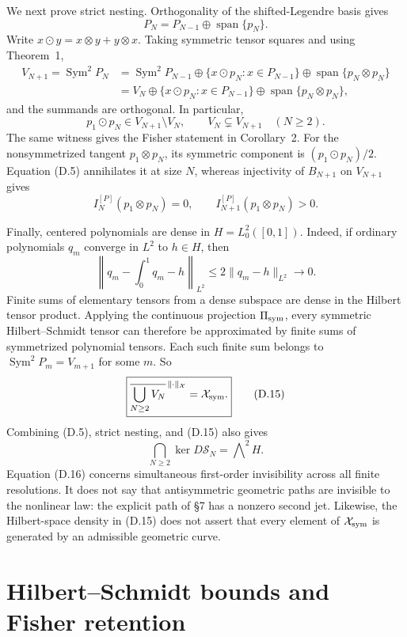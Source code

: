 \documentclass[11pt]{article}
\begin{document}
We next prove strict nesting. Orthogonality of the shifted-Legendre basis gives \[ P_N=P_{N-1}\oplus\operatorname{span}\{p_N\}. \tag{D.10} \] Write \(x\odot y=x\otimes y+y\otimes x\). Taking symmetric tensor squares and using Theorem~1, \[ \begin{aligned} V_{N+1}=\operatorname{Sym}^2P_N &=\operatorname{Sym}^2P_{N-1} \oplus\{x\odot p_N:x\in P_{N-1}\} \oplus\operatorname{span}\{p_N\otimes p_N\}\\ &=V_N\oplus\{x\odot p_N:x\in P_{N-1}\} \oplus\operatorname{span}\{p_N\otimes p_N\}, \end{aligned} \tag{D.11} \] and the summands are orthogonal. In particular, \[ p_1\odot p_N\in V_{N+1}\setminus V_N, \qquad V_N\subsetneq V_{N+1} \quad(N\ge2). \tag{D.12} \] The same witness gives the Fisher statement in Corollary~2. For the nonsymmetrized tangent \(p_1\otimes p_N\), its symmetric component is \((p_1\odot p_N)/2\). Equation (D.5) annihilates it at size \(N\), whereas injectivity of \(B_{N+1}\) on \(V_{N+1}\) gives \[ I_N^{[P]}(p_1\otimes p_N)=0, \qquad I_{N+1}^{[P]}(p_1\otimes p_N)>0. \tag{D.13} \]

Finally, centered polynomials are dense in \(H=L_0^2([0,1])\). Indeed, if ordinary polynomials \(q_m\) converge in \(L^2\) to \(h\in H\), then \[ \left\|q_m-\int_0^1q_m-h\right\|_{L^2} \le2\|q_m-h\|_{L^2}\longrightarrow0. \tag{D.14} \] Finite sums of elementary tensors from a dense subspace are dense in the Hilbert tensor product. Applying the continuous projection \(\Pi_{\rm sym}\), every symmetric Hilbert--Schmidt tensor can therefore be approximated by finite sums of symmetrized polynomial tensors. Each such finite sum belongs to \(\operatorname{Sym}^2P_m=V_{m+1}\) for some \(m\). So \[ \boxed{ \overline{\bigcup_{N\ge2}V_N}^{\,\|\cdot\|_{\mathcal X}} =\mathcal X_{\rm sym}.} \tag{D.15} \] Combining (D.5), strict nesting, and (D.15) also gives \[ \bigcap_{N\ge2}\ker D\mathscr S_N =\bigwedge\nolimits^2H. \tag{D.16} \] Equation (D.16) concerns simultaneous first-order invisibility across all finite resolutions. It does not say that antisymmetric geometric paths are invisible to the nonlinear law: the explicit path of \S7 has a nonzero second jet. Likewise, the Hilbert-space density in (D.15) does not assert that every element of \(\mathcal X_{\rm sym}\) is generated by an admissible geometric curve.

\section{Hilbert--Schmidt bounds and Fisher retention}
\end{document}
